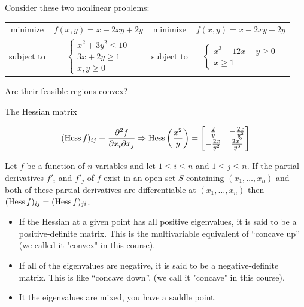 \documentclass[c]{beamer}
\begin{document}
\begin{frame}[t]{}
  \begin{Exercise}
    Consider these two nonlinear problems\cite{carter}:
    \begin{center}
      \begin{tabular}{cc|cc}
        minimize & $f(x,y)=x-2xy+2y$ & minimize & $f(x,y)=x-2xy+2y$\\
        subject to & $\begin{cases}x^2+3y^2\leq10\\3x+2y\geq 1\\x,y\geq 0\end{cases}$ & 
        subject to & $\begin{cases}x^3-12x-y\geq 0\\x\geq 1\end{cases}$
      \end{tabular}
    \end{center}
    Are their feasible regions convex?
   \end{Exercise}
\end{frame}
\begin{frame}[allowframebreaks]{The Hessian matrix}

  \[
  (\operatorname{Hess} f)_{ij} \equiv \frac{\partial^{2} f}{\partial x_{i} \partial x_{j} } \Rightarrow
  \operatorname{Hess}\left( \frac{x^{2}}{y} \right) =
  \begin{bmatrix}
    \frac{2}{y} & - \frac{2x}{y^{2}} \\
    -\frac{2x}{y^{2}} & \frac{2x^{2}}{y^{3}}
  \end{bmatrix}
\]

Let $f$ be a function of $n$ variables and let $1 \leq i \leq n$ and $1 \leq j \leq n$. If the partial derivatives $f'_i$ and $f'_j$ of $f$ exist in an open set $S$ containing $(x_1,\ldots, x_n)$ and both of these partial derivatives are differentiable at $(x_1, \ldots, x_n)$ then $(\operatorname{Hess} f)_{ij}=(\operatorname{Hess} f)_{ji}$.

\begin{itemize}
  \item If the Hessian at a given point has all positive eigenvalues, it is said to be a positive-definite matrix. This is the multivariable equivalent of “concave up” (we called it "convex" in this course).
  \item If all of the eigenvalues are negative, it is said to be a negative-definite matrix. This is like “concave down”. (we call it "concave" in this course).
  \item It the eigenvalues are mixed, you have a saddle point.
\end{itemize}
\end{frame}
\end{document}
